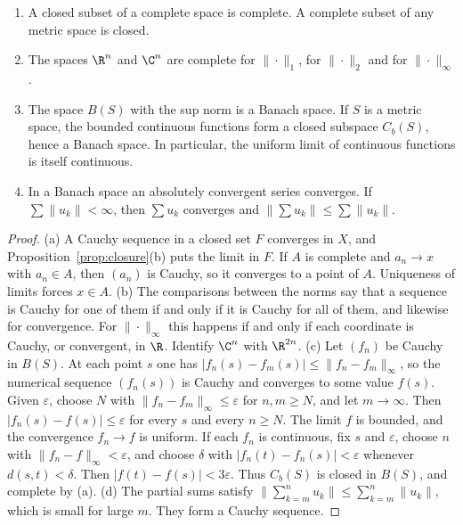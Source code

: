 \begin{proposition}\label{prop:complete}
\begin{enumerate}[label=(\alph*)]
\item A closed subset of a complete space is complete. A complete subset of any metric space is closed.
\item The spaces $\R^n$ and $\C^n$ are complete for $\|\cdot\|_1$, for $\|\cdot\|_2$ and for $\|\cdot\|_\infty$.
\item The space $B(S)$ with the sup norm is a Banach space. If $S$ is a metric space, the bounded continuous functions form a closed subspace $C_b(S)$, hence a Banach space. In particular, the uniform limit of continuous functions is itself continuous.
\item In a Banach space an absolutely convergent series converges. If $\sum\|u_k\|<\infty$, then $\sum u_k$ converges and $\|\sum u_k\|\le\sum\|u_k\|$.
\end{enumerate}
\end{proposition}
\begin{proof}
(a) A Cauchy sequence in a closed set $F$ converges in $X$, and Proposition~\ref{prop:closure}(b) puts the limit in $F$. If $A$ is complete and $a_n\to x$ with $a_n\in A$, then $(a_n)$ is Cauchy, so it converges to a point of $A$. Uniqueness of limits forces $x\in A$. (b) The comparisons between the norms say that a sequence is Cauchy for one of them if and only if it is Cauchy for all of them, and likewise for convergence. For $\|\cdot\|_\infty$ this happens if and only if each coordinate is Cauchy, or convergent, in $\R$. Identify $\C^n$ with $\R^{2n}$. (c) Let $(f_n)$ be Cauchy in $B(S)$. At each point $s$ one has $|f_n(s)-f_m(s)|\le\|f_n-f_m\|_\infty$, so the numerical sequence $(f_n(s))$ is Cauchy and converges to some value $f(s)$. Given $\varepsilon$, choose $N$ with $\|f_n-f_m\|_\infty\le\varepsilon$ for $n,m\ge N$, and let $m\to\infty$. Then $|f_n(s)-f(s)|\le\varepsilon$ for every $s$ and every $n\ge N$. The limit $f$ is bounded, and the convergence $f_n\to f$ is uniform. If each $f_n$ is continuous, fix $s$ and $\varepsilon$, choose $n$ with $\|f_n-f\|_\infty<\varepsilon$, and choose $\delta$ with $|f_n(t)-f_n(s)|<\varepsilon$ whenever $d(s,t)<\delta$. Then $|f(t)-f(s)|<3\varepsilon$. Thus $C_b(S)$ is closed in $B(S)$, and complete by (a). (d) The partial sums satisfy $\|\sum_{k=m}^n u_k\|\le\sum_{k=m}^n\|u_k\|$, which is small for large $m$. They form a Cauchy sequence.
\end{proof}

